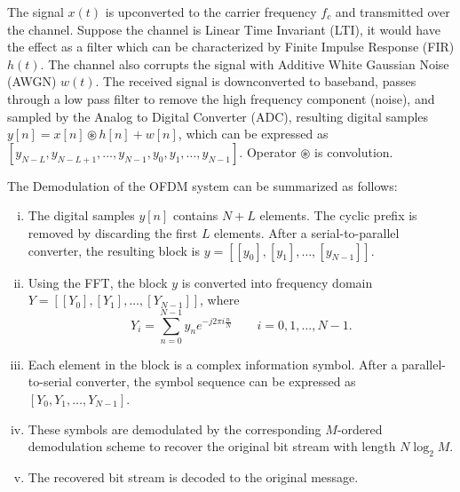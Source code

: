 The signal $x(t)$ is upconverted to the carrier frequency $f_c$ and transmitted over the channel. Suppose the channel is Linear Time Invariant (LTI), it would have the effect as a filter which can be characterized by Finite Impulse Response (FIR) $h(t)$. The channel also corrupts the signal with Additive White Gaussian Noise (AWGN) $w(t)$. The received signal is downconverted to baseband, passes through a low pass filter to remove the high frequency component (noise), and sampled by the Analog to Digital Converter (ADC), resulting digital samples $y[n] = x[n] \circledast h[n] +  w[n]$, which can be expressed as $[y_{N-L}, y_{N-L+1}, \ldots, y_{N-1}, y_0, y_1, \ldots, y_{N-1}]$. Operator $\circledast$ is convolution.

The Demodulation of the OFDM system can be summarized as follows:
\begin{enumerate}[(i)]
    \item The digital samples $y[n]$ contains $N+L$ elements. The cyclic prefix is removed by discarding the first $L$ elements. After a serial-to-parallel converter, the resulting block is $y = [[y_0], [y_1], \ldots, [y_{N-1}]]$.
    \item Using the FFT, the block $y$ is converted into frequency domain $Y = [[Y_{0}], [Y_{1}], \ldots, [Y_{N-1}]]$, where
    \begin{equation}
        Y_i = \sum_{n=0}^{N-1}y_n e^{-j2\pi i\frac{n}{N}} \qquad i=0,1,\ldots,N-1.
    \end{equation}
    \item Each element in the block is a complex information symbol. After a parallel-to-serial converter, the symbol sequence can be expressed as $[Y_{0}, Y_{1}, \ldots, Y_{N-1}]$.
    \item These symbols are demodulated by the corresponding $M$-ordered demodulation scheme to recover the original bit stream with length $N\log_2M$.
    \item The recovered bit stream is decoded to the original message.
\end{enumerate}